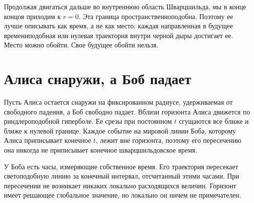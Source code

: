 Продолжая двигаться дальше во внутреннюю область Шварцшильда, мы в конце концов приходим к \(r=0\). Эта граница пространственноподобна. Поэтому ее лучше описывать как время, а не как место: каждая направленная в будущее времениподобная или нулевая траектория внутри черной дыры достигает ее. Место можно обойти. Свое будущее обойти нельзя.

\begin{classroomqa}
\end{classroomqa}

\begin{classroomqa}
\end{classroomqa}

\section{Алиса снаружи, а Боб падает}

Пусть Алиса остается снаружи на фиксированном радиусе, удерживаемая от свободного падения, а Боб свободно падает. Вблизи горизонта Алиса движется по риндлероподобной гиперболе. Ее срезы при постоянном \(t\) сгущаются все ближе и ближе к нулевой границе. Каждое событие на мировой линии Боба, которому Алиса приписывает конечное \(t\), лежит вне горизонта, поэтому его пересечению она никогда не приписывает конечное шварцшильдовское время.

У Боба есть часы, измеряющие собственное время. Его траектория пересекает светоподобную линию за конечный интервал, отсчитанный этими часами. При пересечении не возникает никаких локально расходящихся величин. Горизонт имеет решающее глобальное значение, но локально он ничем не примечателен.

